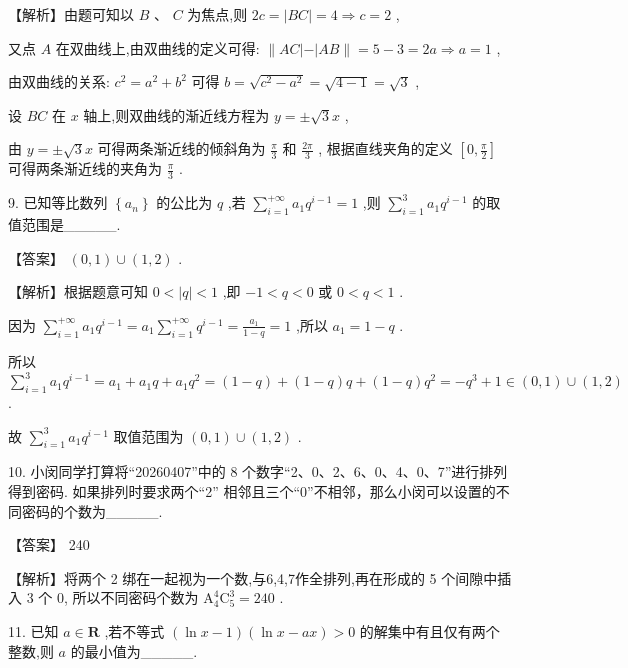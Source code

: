 \documentclass[10pt]{article}
\begin{document}
【解析】由题可知以 \(B\text{ 、 }C\) 为焦点,则 \({2c} = \left| {BC}\right|  = 4 \Rightarrow  c = 2\) ,

又点 \(A\) 在双曲线上,由双曲线的定义可得: \(\parallel {AC}\left| -\right| {AB}\parallel  = 5 - 3 = {2a} \Rightarrow  a = 1\) ,

由双曲线的关系: \({c}^{2} = {a}^{2} + {b}^{2}\) 可得 \(b = \sqrt{{c}^{2} - {a}^{2}} = \sqrt{4 - 1} = \sqrt{3}\) ,

设 \({BC}\) 在 \(x\) 轴上,则双曲线的渐近线方程为 \(y =  \pm  \sqrt{3}x\) ,

由 \(y =  \pm  \sqrt{3}x\) 可得两条渐近线的倾斜角为 \(\frac{\pi }{3}\) 和 \(\frac{2\pi }{3}\) , 根据直线夹角的定义 \(\left\lbrack  {0,\frac{\pi }{2}}\right\rbrack\) 可得两条渐近线的夹角为 \(\frac{\pi }{3}\) .

9. 已知等比数列 \(\left\{  {a}_{n}\right\}\) 的公比为 \(q\) ,若 \(\mathop{\sum }\limits_{{i = 1}}^{{+\infty }}{a}_{1}{q}^{i - 1} = 1\) ,则 \(\mathop{\sum }\limits_{{i = 1}}^{3}{a}_{1}{q}^{i - 1}\) 的取值范围是\_\_\_\_\_.

【答案】 \(\left( {0,1}\right)  \cup  \left( {1,2}\right)\) .

【解析】根据题意可知 \(0 < \left| q\right|  < 1\) ,即 \(- 1 < q < 0\) 或 \(0 < q < 1\) .

因为 \(\mathop{\sum }\limits_{{i = 1}}^{{+\infty }}{a}_{1}{q}^{i - 1} = {a}_{1}\mathop{\sum }\limits_{{i = 1}}^{{+\infty }}{q}^{i - 1} = \frac{{a}_{1}}{1 - q} = 1\) ,所以 \({a}_{1} = 1 - q\) .

所以 \(\mathop{\sum }\limits_{{i = 1}}^{3}{a}_{1}{q}^{i - 1} = {a}_{1} + {a}_{1}q + {a}_{1}{q}^{2} = \left( {1 - q}\right)  + \left( {1 - q}\right) q + \left( {1 - q}\right) {q}^{2} =  - {q}^{3} + 1 \in  \left( {0,1}\right)  \cup  \left( {1,2}\right)\) .

故 \(\mathop{\sum }\limits_{{i = 1}}^{3}{a}_{1}{q}^{i - 1}\) 取值范围为 \(\left( {0,1}\right)  \cup  \left( {1,2}\right)\) .

10. 小闵同学打算将“20260407”中的 8 个数字“2、0、2、6、0、4、0、7”进行排列得到密码. 如果排列时要求两个“2” 相邻且三个“0”不相邻，那么小闵可以设置的不同密码的个数为\_\_\_\_\_.

【答案】 240

【解析】将两个 2 绑在一起视为一个数,与6,4,7作全排列,再在形成的 5 个间隙中插入 3 个 0, 所以不同密码个数为 \({\mathrm{A}}_{4}^{4}{\mathrm{C}}_{5}^{3} = {240}\) .

11. 已知 \(a \in  \mathbf{R}\) ,若不等式 \(\left( {\ln x - 1}\right) \left( {\ln x - {ax}}\right)  > 0\) 的解集中有且仅有两个整数,则 \(a\) 的最小值为\_\_\_\_\_.
\end{document}
